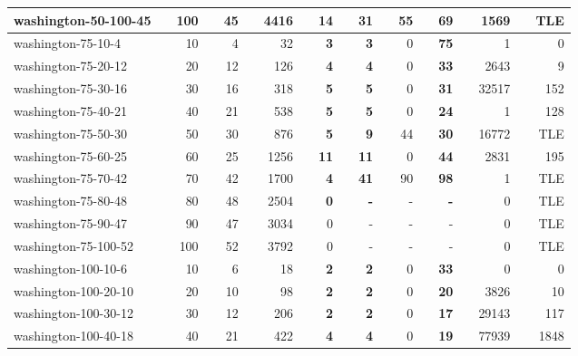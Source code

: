 \begin{table}[!ht]
{\begin{tabular}{llrlrlrlrlrlrlrlrlr}
washington-50-100-45 &  & 100 &  & 45 &  & 4416 &  & \textbf{14} &  & \textbf{31} &  & 55 &  & \textbf{69} &  & 1569 &  & TLE \\ \hline
\rowcolor[HTML]{9B9B9B} 
washington-75-10-4 &  & 10 &  & 4 &  & 32 &  & \textbf{3} &  & \textbf{3} &  & 0 &  & \textbf{75} &  & 1 &  & 0 \\
\rowcolor[HTML]{9B9B9B} 
washington-75-20-12 &  & 20 &  & 12 &  & 126 &  & \textbf{4} &  & \textbf{4} &  & 0 &  & \textbf{33} &  & 2643 &  & 9 \\
\rowcolor[HTML]{9B9B9B} 
washington-75-30-16 &  & 30 &  & 16 &  & 318 &  & \textbf{5} &  & \textbf{5} &  & 0 &  & \textbf{31} &  & 32517 &  & 152 \\
\rowcolor[HTML]{9B9B9B} 
washington-75-40-21 &  & 40 &  & 21 &  & 538 &  & \textbf{5} &  & \textbf{5} &  & 0 &  & \textbf{24} &  & 1 &  & 128 \\
\rowcolor[HTML]{C0C0C0} 
washington-75-50-30 &  & 50 &  & 30 &  & 876 &  & \textbf{5} &  & \textbf{9} &  & 44 &  & \textbf{30} &  & 16772 &  & TLE \\
\rowcolor[HTML]{9B9B9B} 
washington-75-60-25 &  & 60 &  & 25 &  & 1256 &  & \textbf{11} &  & \textbf{11} &  & 0 &  & \textbf{44} &  & 2831 &  & 195 \\
\rowcolor[HTML]{C0C0C0} 
washington-75-70-42 &  & 70 &  & 42 &  & 1700 &  & \textbf{4} &  & \textbf{41} &  & 90 &  & \textbf{98} &  & 1 &  & TLE \\
washington-75-80-48 &  & 80 &  & 48 &  & 2504 &  & \textbf{0} &  & \textbf{-} &  & - &  & \textbf{-} &  & 0 &  & TLE \\
washington-75-90-47 &  & 90 &  & 47 &  & 3034 &  & 0 &  & - &  & - &  & - &  & 0 &  & TLE \\
washington-75-100-52 &  & 100 &  & 52 &  & 3792 &  & 0 &  & - &  & - &  & - &  & 0 &  & TLE \\ \hline
\rowcolor[HTML]{9B9B9B} 
washington-100-10-6 &  & 10 &  & 6 &  & 18 &  & \textbf{2} &  & \textbf{2} &  & 0 &  & \textbf{33} &  & 0 &  & 0 \\
\rowcolor[HTML]{9B9B9B} 
washington-100-20-10 &  & 20 &  & 10 &  & 98 &  & \textbf{2} &  & \textbf{2} &  & 0 &  & \textbf{20} &  & 3826 &  & 10 \\
\rowcolor[HTML]{9B9B9B} 
washington-100-30-12 &  & 30 &  & 12 &  & 206 &  & \textbf{2} &  & \textbf{2} &  & 0 &  & \textbf{17} &  & 29143 &  & 117 \\
\rowcolor[HTML]{9B9B9B} 
washington-100-40-18 &  & 40 &  & 21 &  & 422 &  & \textbf{4} &  & \textbf{4} &  & 0 &  & \textbf{19} &  & 77939 &  & 1848 \\

\end{tabular}}
\end{table}

